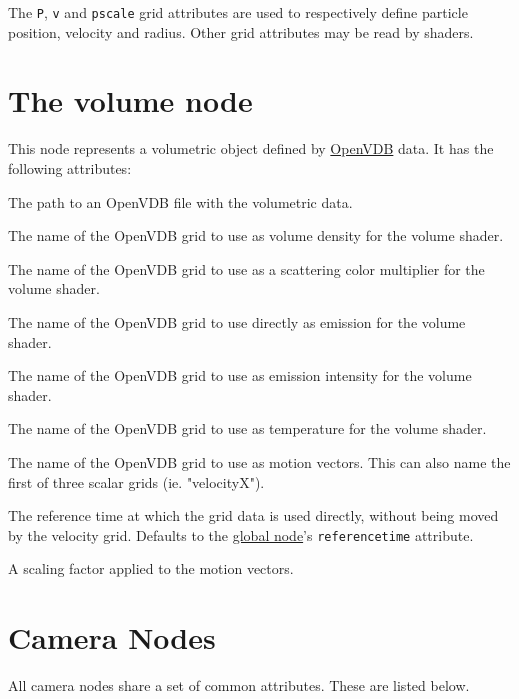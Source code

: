\documentclass[oneside,ebook]{memoir}
\newcommand{\paramlistitemTN}[2]{\item[#2\textcolor{lightgray}{\dotfill}#1]}
\newcommand{\paramlistitemTND}[3]{\paramlistitemTN{#1 {\rmfamily({\ttfamily#3})}}{#2}}
\begin{document}
The \lstinline|P|, \lstinline|v| and \lstinline|pscale| grid attributes are used to respectively define particle position, velocity and radius.
Other grid attributes may be read by shaders.

\section{The volume node}
\label{section:volumenode}
This node represents a volumetric object defined by \href{http:/www.openvdb.org}{OpenVDB} data. It has the following attributes:

\begin{paramlist}
\paramlistitemTN{string}{vdbfilename}
The path to an OpenVDB file with the volumetric data.
\paramlistitemTN{string}{densitygrid}
The name of the OpenVDB grid to use as volume density for the volume shader.
\paramlistitemTN{string}{colorgrid}
The name of the OpenVDB grid to use as a scattering color multiplier for the volume shader.
\paramlistitemTN{string}{emissiongrid}
The name of the OpenVDB grid to use directly as emission for the volume shader.
\paramlistitemTN{string}{emissionintensitygrid}
The name of the OpenVDB grid to use as emission intensity for the volume shader.
\paramlistitemTN{string}{temperaturegrid}
The name of the OpenVDB grid to use as temperature for the volume shader.
\paramlistitemTN{string}{velocitygrid}
The name of the OpenVDB grid to use as motion vectors. This can also name the first of three scalar grids (ie. "velocityX").
\paramlistitemTN{double}{velocityreferencetime}
The reference time at which the grid data is used directly, without being moved by the velocity grid.
Defaults to the \hyperref[section:globalnode]{global node}'s \lstinline|referencetime| attribute.
\paramlistitemTND{double}{velocityscale}{1}
A scaling factor applied to the motion vectors.
\end{paramlist}

\section{Camera Nodes}
\label{section:camera}
All camera nodes share a set of common attributes. These are listed below.
\end{document}
